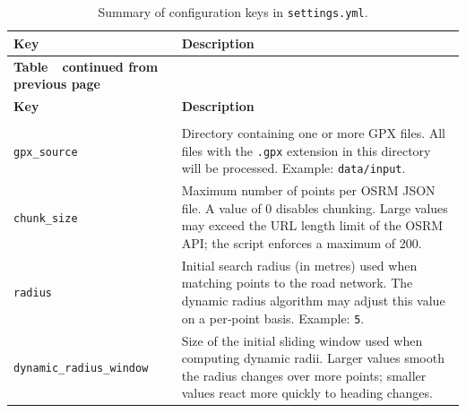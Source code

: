 \documentclass[11pt,a4paper]{article}
\begin{document}
\begin{longtable}{@{}>{\footnotesize\ttfamily}p{4cm}p{9cm}@{}}	\caption{Summary of configuration keys in \texttt{settings.yml}.\label{tab:settings}}                                                                                       \\
	\toprule
	\textbf{Key}                     & \textbf{Description}                                                                                                                                                                   \\
	\midrule
	\endfirsthead
	\multicolumn{2}{c}%
	{{\bfseries Table~\thetable\ continued from previous page}}                                                                                                                                                               \\
	\toprule
	\textbf{Key}                     & \textbf{Description}                                                                                                                                                                   \\
	\midrule
	\endhead
	\midrule \multicolumn{2}{r}{\emph{Continued on next page}}                                                                                                                                                                \\
	\endfoot
	\bottomrule
	\endlastfoot
	\texttt{gpx\_source}             & Directory containing one or more GPX files.  All files with the \texttt{.gpx} extension in this directory will be processed.  Example: \texttt{data/input}.                            \\
	\texttt{chunk\_size}             & Maximum number of points per OSRM JSON file.  A value of 0 disables chunking.  Large values may exceed the URL length limit of the OSRM API; the script enforces a maximum of 200.     \\
	\texttt{radius}                  & Initial search radius (in metres) used when matching points to the road network.  The dynamic radius algorithm may adjust this value on a per‑point basis.  Example: \texttt{5}.       \\
	\texttt{dynamic\_radius\_window} & Size of the initial sliding window used when computing dynamic radii.  Larger values smooth the radius changes over more points; smaller values react more quickly to heading changes. \\
\end{longtable}
\end{document}
